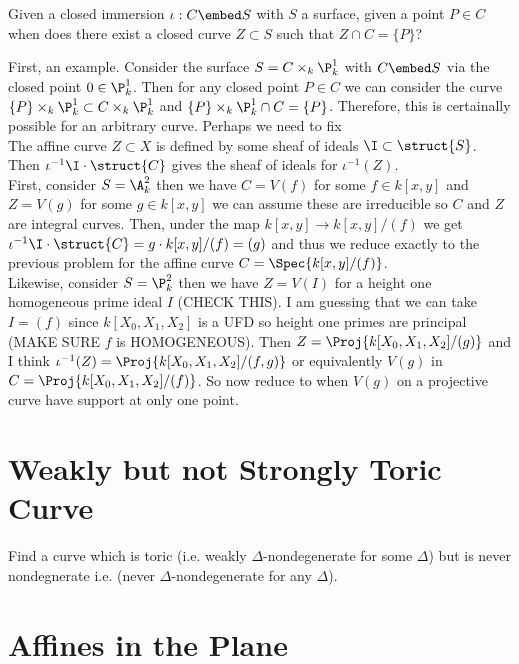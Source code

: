 \documentclass[12pt]{article}
\begin{document}
\begin{exercise}
Given a closed immersion $\iota : C \embed S$ with $S$ a surface, given a point $P \in C$ when does there exist a closed curve $Z \subset S$ such that $Z \cap C = \{ P \}$?
\end{exercise}
\noindent
First, an example. Consider the surface $S = C \times_k \P^1_k$ with $C \embed S$ via the closed point $0 \in \P^1_k$. Then for any closed point $P \in C$ we can consider the curve $\{ P \} \times_k \P^1_k \subset C \times_k \P^1_k$ and $\{ P \} \times_k \P^1_k \cap C = \{ P \}$. Therefore, this is certainally possible for an arbitrary curve. Perhaps we need to fix 
\bigskip\\
The affine curve $Z \subset X$ is defined by some sheaf of ideals $\I \subset \struct{S}$. Then $\iota^{-1} \I \cdot \struct{C}$ gives the sheaf of ideals for $\iota^{-1}(Z)$. 
\bigskip\\
First, consider $S = \A^2_k$ then we have $C = V(f)$ for some $f \in k[x,y]$ and $Z = V(g)$ for some $g \in k[x,y]$ we can assume these are irreducible so $C$ and $Z$ are integral curves. Then, under the map $k[x,y] \to k[x,y]/(f)$ we get $\iota^{-1} \I \cdot \struct{C} = g \cdot k[x,y]/(f) = (g)$ and thus we reduce exactly to the previous problem for the affine curve $C = \Spec{k[x,y]/(f)}$.
\bigskip\\
Likewise, consider $S = \P^2_k$ then we have $Z = V(I)$ for a height one homogeneous prime ideal $I$ (CHECK THIS). I am guessing that we can take $I = (f)$ since $k[X_0, X_1, X_2]$ is a UFD so height one primes are principal (MAKE SURE $f$ is HOMOGENEOUS). Then $Z = \Proj{k[X_0, X_1, X_2]/(g)}$ and I think $\iota^{-1}(Z) = \Proj{k[X_0, X_1, X_2]/(f, g)}$ or equivalently $V(g)$ in $C = \Proj{k[X_0, X_1, X_2]/(f)}$. So now reduce to when $V(g)$ on a projective curve have support at only one point. 


\section{Weakly but not Strongly Toric Curve}

Find a curve which is toric (i.e. weakly $\Delta$-nondegenerate for some $\Delta$) but is never nondegnerate i.e. (never $\Delta$-nondegenerate for any $\Delta$). 

\section{Affines in the Plane}
\end{document}
